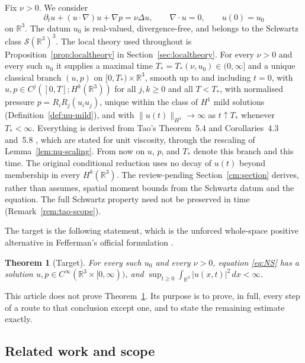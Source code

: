 \documentclass[11pt]{article}
\newtheorem{theorem}{Theorem}[section]
\theoremstyle{definition}
\theoremstyle{plain}
\newcommand{\R}{\mathbb R}
\newcommand{\norm}[1]{\lVert #1\rVert}
\begin{document}
Fix $\nu>0$.  We consider
\begin{equation}\label{eq:NS}
 \partial_tu+(u\cdot\nabla)u+\nabla p=\nu\Delta u,
 \qquad \nabla\cdot u=0,
 \qquad u(0)=u_0
\end{equation}
on $\R^3$.  The datum $u_0$ is real-valued, divergence-free, and belongs to
the Schwartz class $\mathcal S(\R^3)^3$.
\label{premise:local}
The local theory used throughout is Proposition~\ref{prop:localtheory} in
Section~\ref{sec:localtheory}.  For every $\nu>0$ and every such $u_0$ it
supplies a maximal time $T_*=T_*(\nu,u_0)\in(0,\infty]$ and a unique
classical branch $(u,p)$ on $[0,T_*)\times\R^3$, smooth up to and including
$t=0$, with $u,p\in C^j([0,T];H^k(\R^3))$ for all $j,k\geq0$ and all
$T<T_*$, with normalised pressure $p=R_iR_j(u_iu_j)$, unique within the
class of $H^1$ mild solutions (Definition~\ref{def:nu-mild}), and with
$\norm{u(t)}_{H^1}\to\infty$ as $t\uparrow T_*$ whenever $T_*<\infty$.
Everything is derived from Tao's Theorem~5.4 and Corollaries~4.3 and~5.8
\cite{Tao2013}, which are stated for unit viscosity, through the rescaling
of Lemma~\ref{lem:nu-scaling}.  From now on $u$, $p$, and $T_*$ denote this
branch and this time. The original conditional reduction uses no decay
of $u(t)$ beyond membership in every $H^k(\R^3)$. The review-pending
Section~\ref{cm:section} derives, rather than assumes, spatial moment
bounds from the Schwartz datum and the equation. The full Schwartz
property need not be preserved in time (Remark~\ref{rem:tao-scope}).


The target is the following statement, which is the unforced whole-space
positive alternative in Fefferman's official formulation
\cite{Fefferman2000}.

\begin{theorem}[Target]\label{def:target}
For every such $u_0$ and every $\nu>0$, equation \eqref{eq:NS} has a solution
$u,p\in C^\infty(\R^3\times[0,\infty))$, and
$\sup_{t\geq0}\int_{\R^3}|u(x,t)|^2\,dx<\infty$.
\end{theorem}

This article does not prove Theorem~\ref{def:target}.  Its purpose is to
prove, in full, every step of a route to that conclusion except one, and to
state the remaining estimate exactly.

\subsection{Related work and scope}
\label{subsec:related}
\end{document}

